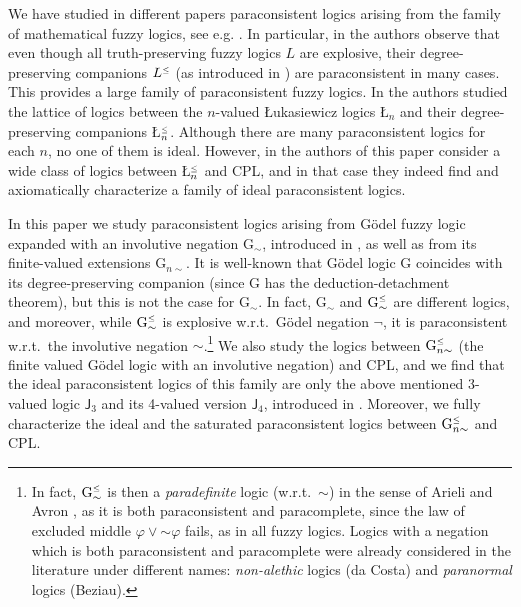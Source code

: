 \documentclass{article}
\theoremstyle{definition}
\newcommand{\ninv}{\mathord{\sim}}
\newcommand{\Gsimleq}{\mathrm{G}\mystrut^{\text{\tiny $\leq$}}_{\sim}}
\newcommand{\Gnsimleq}{\mathrm{G}\mystrut^{\text{\tiny $\leq$}}_{n\sim}}
\newcommand\mystrut{\rule{0pt}{7pt}}
\begin{document}
We have studied in different papers paraconsistent logics arising from the family of mathematical fuzzy logics, see e.g. \cite{EEFGN,CoEsGo:14,CoEsGo,CoEsGiGo}.  In particular, in \cite{EEFGN} the authors observe that even though all truth-preserving fuzzy logics $L$ are explosive, their degree-preserving companions $L^{\text{\tiny $\leq$}}$ (as introduced in \cite{BEFGGTV}) are paraconsistent in many cases. This provides a large family of paraconsistent fuzzy logics. In \cite{CoEsGo} the authors studied the lattice of logics between the $n$-valued {\L}ukasiewicz logics \L$_n$ and their degree-preserving companions \L$_n^{\text{\tiny $\leq$}}$. Although there are  many paraconsistent logics for each $n$, no one of them is ideal. However, in \cite{CoEsGiGo} the authors of this paper consider {a wide class of}  logics between  \L$_n^{\text{\tiny $\leq$}}$ and CPL, and in that case they indeed find and axiomatically characterize a family of ideal paraconsistent logics.

In this paper we study paraconsistent logics arising from G\"odel fuzzy logic expanded with an involutive negation G$_\sim$, introduced in  \cite{EsGoHaNa}, as well as from its finite-valued extensions G$_{n\sim}$.
It is well-known that G\"odel logic G coincides with its degree-preserving companion (since
G has the deduction-detachment theorem), but this is not the case for G$_\sim$. In fact, G$_\sim$ and $\Gsimleq$ are different logics, and moreover, while $\Gsimleq$ is explosive w.r.t.\ G\"odel negation $\neg$, it is paraconsistent w.r.t.\ the involutive negation $\sim$.\footnote{In fact, $\Gsimleq$ is then a {\em paradefinite}
logic (w.r.t.\ $\ninv$)  in the sense of Arieli and Avron
\cite{ArieliAvron}, as it is both paraconsistent and paracomplete,
since the law of excluded middle $\varphi \lor \ninv \varphi$ fails,
as in all fuzzy logics.
Logics with a negation which is both paraconsistent and paracomplete
were already considered in the literature under different names: {\em
non-alethic} logics (da Costa) and {\em paranormal} logics (Beziau).
} We also study the logics between $\Gnsimleq$ (the finite valued G\"odel logic with an involutive negation) and CPL, and we find that the ideal paraconsistent logics of this family are only the above mentioned 3-valued logic $\mathsf{J}_3$ and its 4-valued version $\mathsf{J}_4$,
introduced in \cite{CoEsGiGo}.
Moreover, we fully characterize the ideal and the saturated paraconsistent logics between $\Gnsimleq$ and CPL.
\end{document}
